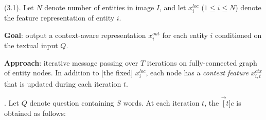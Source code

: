 \documentclass[11pt]{article}
\begin{document}



 (3.1). Let $N$ denote number of entities in image $I$, and let $x_i^{loc}$ ($1 \le i \le N$) denote the feature representation of entity $i$. 
\begin{compactitem}
	\item \textbf{Goal}: output a context-aware representation $x_i^{out}$ for each entity $i$ conditioned on the textual input $Q$. 
	\item \textbf{Approach}: iterative message passing over $T$ iterations on fully-connected graph of entity nodes. In addition to [the fixed] $x_i^{loc}$, each node has a \textit{context feature} $x_{i,t}^{ctx}$ that is updated during each iteration $t$. 
\end{compactitem}

. Let $Q$ denote question containing $S$ words. At each iteration $t$, the  $\vec[t]{c}$ is obtained as follows:
\end{document}
